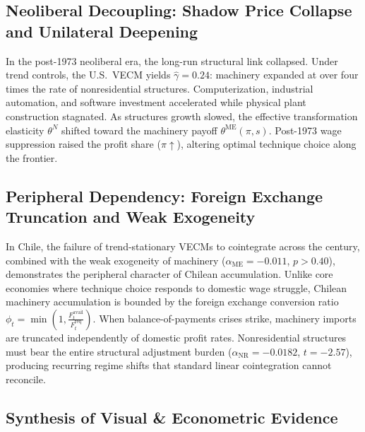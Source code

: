 \documentclass[11pt,a4paper]{article}
\begin{document}
\subsection{Neoliberal Decoupling: Shadow Price Collapse and Unilateral Deepening}
In the post-1973 neoliberal era, the long-run structural link collapsed. Under trend controls, the U.S.\ VECM yields $\hat{\gamma} = 0.24$: machinery expanded at over four times the rate of nonresidential structures. Computerization, industrial automation, and software investment accelerated while physical plant construction stagnated. As structures growth slowed, the effective transformation elasticity $\theta^N$ shifted toward the machinery payoff $\theta^{\text{ME}}(\pi, s)$. Post-1973 wage suppression raised the profit share ($\pi \uparrow$), altering optimal technique choice along the frontier.

\subsection{Peripheral Dependency: Foreign Exchange Truncation and Weak Exogeneity}
In Chile, the failure of trend-stationary VECMs to cointegrate across the century, combined with the weak exogeneity of machinery ($\alpha_{\text{ME}} = -0.011$, $p > 0.40$), demonstrates the peripheral character of Chilean accumulation. Unlike core economies where technique choice responds to domestic wage struggle, Chilean machinery accumulation is bounded by the foreign exchange conversion ratio $\phi_t = \min\left(1, \frac{F^{\text{avail}}_t}{F^{\text{req}}_t}\right)$. When balance-of-payments crises strike, machinery imports are truncated independently of domestic profit rates. Nonresidential structures must bear the entire structural adjustment burden ($\alpha_{\text{NR}} = -0.0182$, $t = -2.57$), producing recurring regime shifts that standard linear cointegration cannot reconcile.

\subsection{Synthesis of Visual & Econometric Evidence}
\end{document}
